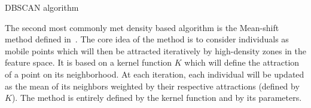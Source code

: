 \begin{algorithm}
    \caption{DBSCAN algorithm}
\label{alg:dbscan}

    \end{algorithm}


    The second most commonly met density based algorithm is the Mean-shift method defined in~\cite{cheng1995mean}. The core idea of the method is to consider individuals as mobile points which will then be attracted iteratively by high-density zones in the feature space. It is based on a kernel function $K$ which will define the attraction of a point on its neighborhood. At each iteration, each individual will be updated as the mean of its neighbors weighted by their respective attractions (defined by $K$). The method is entirely defined by the kernel function and by its parameters.

